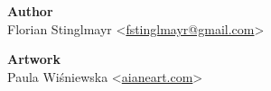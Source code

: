 \onecolumn


\vspace*{\fill}

\begin{center}
  \textbf{Author}\\
  Florian Stinglmayr
  <\href{mailto:fstinglmayr@gmail.com}{fstinglmayr@gmail.com}>

  \textbf{Artwork}\\
  Paula Wiśniewska
  <\href{http://aianeart.com}{aianeart.com}>
\end{center}

\twocolumn
\newpage
